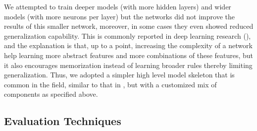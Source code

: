 \documentclass[11pt, a4paper]{article}
\begin{document}
We attempted to train deeper models (with more hidden layers) and wider models (with more neurons per layer) but the networks did not improve the results of this smaller network, moreover, in some cases they even showed reduced generalization capability. This is commonly reported in deep learning research (\cite{ObrienStack}), and the explanation is that, up to a point, increasing the complexity of a network help learning more abstract features and more combinations of these features, but it also encourages memorization instead of learning broader rules thereby limiting generalization. Thus, we adopted a simpler high level model skeleton that is common in the field, similar to that in \cite{sezer2018algorithmic}, but with a customized mix of components as specified above.

\subsection{Evaluation Techniques}
\label{subsec:DM:Eval}
\end{document}
